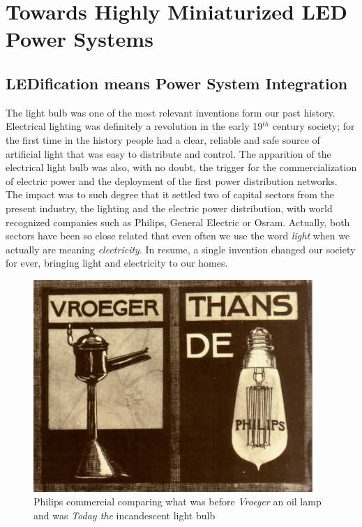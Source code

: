 \part{Towards Highly Miniaturized LED Power Systems }
\label{ch:twrd_HMLED}

\chapter[LEDification]{LEDification means Power System Integration}


The light bulb was one of the most relevant inventions form our past history.  Electrical lighting was definitely a revolution in the early 19$^{th}$ century society; for the first time in the history people had a clear, reliable and safe source of artificial light that was easy to distribute and control.
The apparition  of the electrical light bulb was also, with no doubt, the trigger for the commercialization of electric power and the deployment of the first power distribution networks. The impact was to such degree that it settled two of capital sectors from the present industry, the lighting and the electric power distribution, with  world recognized companies such as Philips, General Electric or Osram.  Actually, both sectors have been so close related that even often we use the word \emph{light} when we actually are meaning \emph{electricity}. In resume, a single invention changed our society for ever, bringing light and electricity to our homes.

\begin{figure}[!h]
\centering
\includegraphics{./0_intro/img/1900-philips3.jpg}
\caption{Philips commercial comparing what was before \emph{Vroeger} an oil lamp and was \emph{Today the} incandescent light bulb}
\label{fig:incandescent_light_blub}
\end{figure}


